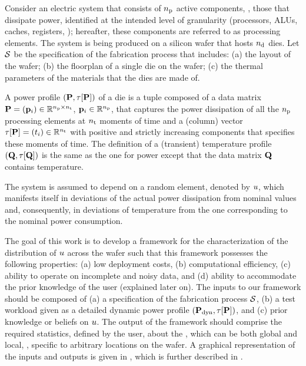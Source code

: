 Consider an electric system that consists of ${n_\text{p}}$ active components, \ie, those that dissipate power, identified at the intended level of granularity (processors, ALUs, caches, registers, \etc); hereafter, these components are referred to as processing elements.
The system is being produced on a silicon wafer that hosts ${n_\text{d}}$ dies.
Let $\mathcal{S}$ be the specification of the fabrication process that includes: (a) the layout of the wafer; (b) the floorplan of a single die on the wafer; (c) the thermal parameters of the materials that the dies are made of.

A power profile $\profileP$ of a die is a tuple composed of a data matrix $\mathbf{P} = (\mathbf{p}_i) \in \mathbb{R}^{{n_\text{p}} \times {n_\text{t}}}$, $\mathbf{p}_i \in \mathbb{R}^{n_\text{p}}$, that captures the power dissipation of all the ${n_\text{p}}$ processing elements at ${n_\text{t}}$ moments of time and a (column) vector $\tau[\mathbf{P}] = (t_i) \in \mathbb{R}^{{n_\text{t}}}$ with positive and strictly increasing components that specifies these moments of time.
The definition of a (transient) temperature profile $\profileT$ is the same as the one for power except that the data matrix $\mathbf{Q}$ contains temperature.

The system is assumed to depend on a random element, denoted by $u$, which manifests itself in deviations of the actual power dissipation from nominal values and, consequently, in deviations of temperature from the one corresponding to the nominal power consumption.

The goal of this work is to develop a framework for the characterization of the distribution of $u$ across the wafer such that this framework possesses the following properties: (a) low deployment costs, (b) computational efficiency, (c) ability to operate on incomplete and noisy data, and (d) ability to accommodate the prior knowledge of the user (explained later on).
The inputs to our framework should be composed of (a) a specification of the fabrication process $\mathcal{S}$, (b) a test workload given as a detailed dynamic power profile $(\mathbf{P}_{\text{dyn}}, \tau[\mathbf{P}])$, and (c) prior knowledge or beliefs on $u$.
The output of the framework should comprise the required statistics, defined by the user, about the \qoi, which can be both global and local, \ie, specific to arbitrary locations on the wafer.
A graphical representation of the inputs and outputs is given in , which is further described in .

